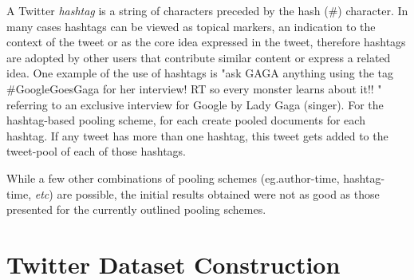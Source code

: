 \documentclass{sig-alternate}
\begin{document}
\vspace{1mm} A Twitter \textit{hashtag} is a
string of characters preceded by the hash (\#) character. In many
cases hashtags can be viewed as topical markers, an indication to the
context of the tweet or as the core idea expressed in the tweet,
therefore hashtags are adopted by other users that contribute similar
content or express a related idea. One example of the use of hashtags
is "ask GAGA anything using the tag \#GoogleGoesGaga for her
interview! RT so every monster learns about it!! " referring to an
exclusive interview for Google by Lady Gaga (singer).
For the hashtag-based pooling scheme, for each create pooled documents
for each hashtag. If any tweet has more than one hashtag, this tweet
gets added to the tweet-pool of each of those hashtags.

\vspace{1mm} While a few other combinations of
pooling schemes (eg.author-time, hashtag-time, \textit{etc}) are
possible, the initial results obtained were not as good as those
presented for the currently outlined pooling schemes.  


\section{Twitter Dataset Construction}

\label{sec:dataset}

\end{document}
